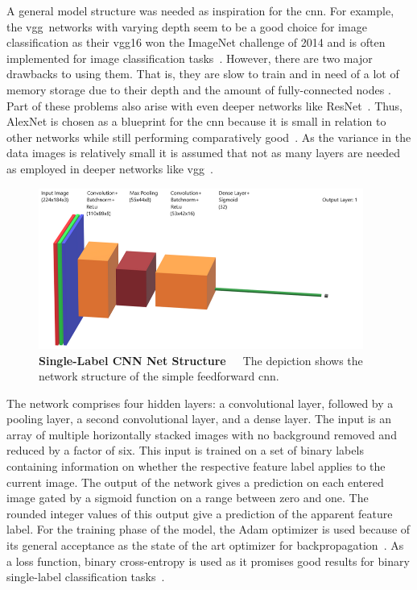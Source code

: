 A general model structure was needed as inspiration for the \acrshort{cnn}. For example, the \acrfull{vgg}~networks with varying depth seem to be a good choice for image classification as their \acrshort{vgg}16 won the ImageNet challenge of 2014 and is often implemented for image classification tasks~\citep{hassan2018vgg,vgg2014original}. However, there are two major drawbacks to using them. That is, they are slow to train and in need of a lot of memory storage due to their depth and the amount of fully-connected nodes \citep{hassan2018vgg,zhang2015accelerating}. Part of these problems also arise with even deeper networks like ResNet~\citep{resnet2016original,hassan2019resnet}. Thus, AlexNet is chosen as a blueprint for the \acrshort{cnn} because it is small in relation to other networks while still performing comparatively good~\citep{hassan2019alexnet,alexnet2012original,geron2019hands}. As the variance in the data images is relatively small it is assumed that not as many layers are needed as employed in deeper networks like \acrshort{vgg}~\citep{geron2019hands}.

\begin{figure}[!htb]
	\centering
	\includegraphics[width=0.95\textwidth]{Figures/chapter04/singleCNN_net_structure.png}
	\caption[Single-Label CNN Net Structure]{\textbf{Single-Label CNN Net Structure}~~~The depiction shows the network structure of the simple feedforward \acrshort{cnn}.}
	\label{fig:SingleLabelNetStructure}
\end{figure}
 
\bigskip
The network comprises four hidden layers: a convolutional layer, followed by a pooling layer, a second convolutional layer, and a dense layer. The input is an array of multiple horizontally stacked images with no background removed and reduced by a factor of six. This input is trained on a set of binary labels containing information on whether the respective feature label applies to the current image. The output of the network gives a prediction on each entered image gated by a sigmoid function on a range between zero and one. The rounded integer values of this output give a prediction of the apparent feature label.
For the training phase of the model, the Adam optimizer is used because of its general acceptance as the state of the art optimizer for backpropagation~\citep{bushaev2018adam,kingma2014adam}. As a loss function, binary cross-entropy is used as it promises good results for binary single-label classification tasks~\citep{geron2019hands,godoy2018understanding,dertat2017applied}.
 
